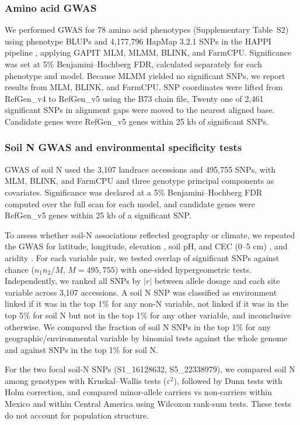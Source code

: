 \subsubsection{Amino acid GWAS}
We performed GWAS for 78 amino acid phenotypes (Supplementary Table~S2) using phenotype BLUPs and 4,177,796 HapMap 3.2.1 SNPs in the HAPPI pipeline \citep{Slaten2020HAPPI}, applying GAPIT MLM, MLMM, BLINK, and FarmCPU. Significance was set at 5\% Benjamini--Hochberg FDR, calculated separately for each phenotype and model. Because MLMM yielded no significant SNPs, we report results from MLM, BLINK, and FarmCPU. SNP coordinates were lifted from RefGen\_v4 to RefGen\_v5 using the B73 chain file, Twenty one of 2,461 significant SNPs in alignment gaps were moved to the nearest aligned base. Candidate genes were RefGen\_v5 genes within 25 kb of significant SNPs.

\subsubsection{Soil N GWAS and environmental specificity tests}
GWAS of soil N used the 3,107 landrace accessions and 495,755 SNPs, with MLM, BLINK, and FarmCPU \citep{Slaten2020HAPPI} and three genotype principal components as covariates. Significance was declared at a 5\% Benjamini--Hochberg FDR computed over the full scan for each model, and candidate genes were RefGen\_v5 genes within 25 kb of a significant SNP.

To assess whether soil-N associations reflected geography or climate, we repeated the GWAS for latitude, longitude, elevation \citep{RomeroNavarro2017Landraces}, soil pH, and CEC (0--5 cm) \citep{Poggio2021SoilGrids}, and aridity \citep{Zomer2022Aridity}. For each variable pair, we tested overlap of significant SNPs against chance ($n_1 n_2 / M$, $M = 495{,}755$) with one-sided hypergeometric tests. Independently, we ranked all SNPs by $|r|$ between allele dosage and each site variable across 3,107 accessions. A soil N SNP was classified as environment linked if it was in the top 1\% for any non-N variable, not linked if it was in the top 5\% for soil N but not in the top 1\% for any other variable, and inconclusive otherwise. We compared the fraction of soil N SNPs in the top 1\% for any geographic/environmental variable by binomial tests against the whole genome and against SNPs in the top 1\% for soil N.

For the two focal soil-N SNPs (S1\_16128632, S5\_22338979), we compared soil N among genotypes with Kruskal--Wallis tests ($\varepsilon^2$), followed by Dunn tests with Holm correction, and compared minor-allele carriers vs non-carriers within Mexico and within Central America using Wilcoxon rank-sum tests. These tests do not account for population structure.

